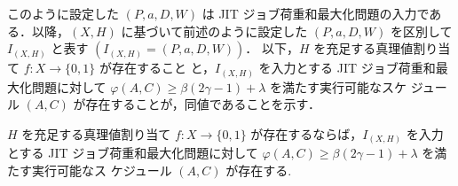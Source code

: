 \documentclass[12pt]{optlab-bachelor}
\begin{document}
このように設定した $(P,a,D,W)$ は JIT ジョブ荷重和最大化問題の入力である．以降，$(X,H)$ に基づいて前述のように設定した $(P,a,D,W)$ を区別して $I_{(X,H)}$ と表す $(I_{(X,H)} = (P,a,D,W))$．
以下，$H$ を充足する真理値割り当て $f : X \to \{0,1\}$ が存在すること
と，$I_{(X,H)}$ を入力とする JIT ジョブ荷重和最大化問題に対して
$\varphi(A,C) \ge \beta(2\gamma - 1) + \lambda$ を満たす実行可能なスケ
ジュール $(A,C)$ が存在することが，同値であることを示す．

\begin{lemma}\label{l_1}
  $H$ を充足する真理値割り当て $f : X \to \{0,1\}$ が存在するならば，$I_{(X,H)}$ を入力とする JIT ジョブ荷重和最大化問題に対して
  $\varphi(A, C) \ge \beta(2\gamma - 1) + \lambda$ を満たす実行可能なス
  ケジュール $(A, C)$ が存在する.
\end{lemma}
\end{document}
